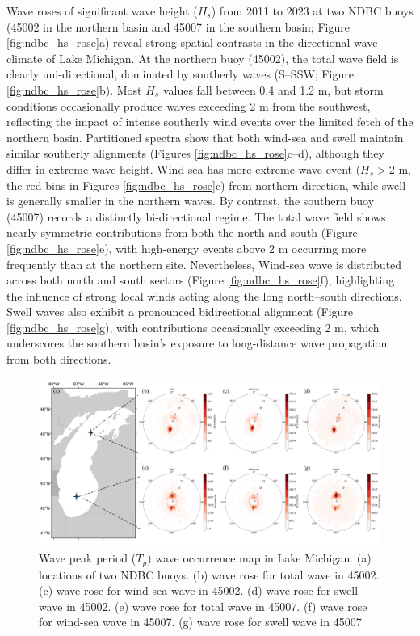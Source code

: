 Wave roses of significant wave height ($H_s$) from 2011 to 2023 at two NDBC
buoys (45002 in the northern basin and 45007 in the southern basin; Figure
\ref{fig:ndbc_hs_rose}a) reveal strong spatial contrasts in the directional wave
climate of Lake Michigan. At the northern buoy (45002), the total wave field is
clearly uni-directional, dominated by southerly waves (S–SSW; Figure
\ref{fig:ndbc_hs_rose}b). Most $H_s$ values fall between 0.4 and 1.2 m, but
storm conditions occasionally produce waves exceeding 2 m from the southwest,
reflecting the impact of intense southerly wind events over the limited fetch of
the northern basin. Partitioned spectra show that both wind-sea and swell
maintain similar southerly alignments (Figures \ref{fig:ndbc_hs_rose}c–d),
although they differ in extreme wave height. Wind-sea has more extreme wave
event ($H_s > 2$ m, the red bins in Figures \ref{fig:ndbc_hs_rose}c) from
northern direction, while swell is generally smaller in the northern waves. By
contrast, the southern buoy (45007) records a distinctly bi-directional regime.
The total wave field shows nearly symmetric contributions from both the north
and south (Figure \ref{fig:ndbc_hs_rose}e), with high-energy events above 2 m
occurring more frequently than at the northern site. Nevertheless, Wind-sea wave
is distributed across both north and south sectors (Figure
\ref{fig:ndbc_hs_rose}f), highlighting the influence of strong local winds
acting along the long north–south directions. Swell waves also exhibit a
pronounced bidirectional alignment (Figure \ref{fig:ndbc_hs_rose}g), with
contributions occasionally exceeding 2 m, which underscores the southern basin’s
exposure to long-distance wave propagation from both directions.

\begin{figure}[htbp]
  \centering
  \includegraphics[width=1\textwidth]{chapter4/resources/ndbc_occ_rose.png}
  \caption{Wave peak period ($T_p$) wave occurrence map in Lake Michigan. (a)
  locations of two NDBC buoys. (b) wave rose for total wave in 45002. (c) wave
  rose for wind-sea wave in 45002. (d) wave rose for swell wave in 45002. (e)
  wave rose for total wave in 45007. (f) wave rose for wind-sea wave in 45007.
  (g) wave rose for swell wave in 45007}
  \label{fig:ndbc_occ_rose}
\end{figure}

